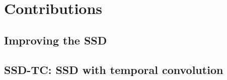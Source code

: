 \chapter{Contributions}

\section{Improving the SSD}

\section{SSD-TC: SSD with temporal convolution}



